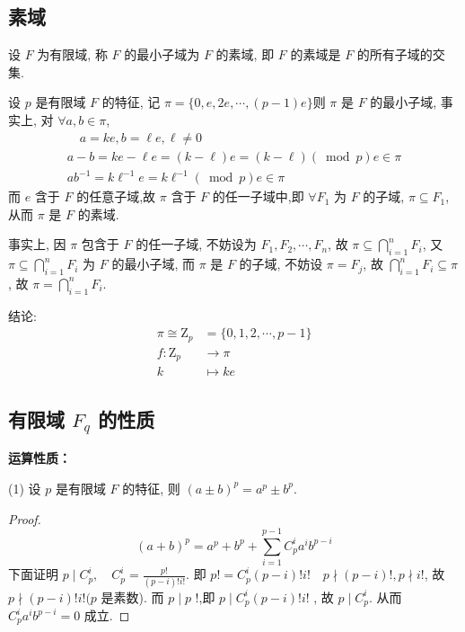 \subsection{素域}
\begin{definition}
    设 $ F $ 为有限域, 称 $ F $ 的最小子域为 $ F $ 的素域, 即 $ F $ 的素域是 $ F $ 的所有子域的交集.
\end{definition}

设 $ p $ 是有限域 $ F $ 的特征, 记 $ \pi=\{0, e, 2 e, \cdots,(p-1) e\} $则 $ \pi $ 是 $ F $ 的最小子域, 事实上, 对 $ \forall a, b \in \pi $,
$$
\begin{array}{l}
\quad a=k e, b=\ell e, \ell \neq 0 \\
a-b=k e-\ell e=(k-\ell) e=(k-\ell)(\bmod p) e \in \pi \\
a b^{-1}=k \ell^{-1} e=k \ell^{-1}(\bmod p) e \in \pi
\end{array}
$$
而 $ e $ 含于 $ F $ 的任意子域,故 $ \pi $ 含于 $ F $ 的任一子域中,即 $ \forall F_{1} $ 为 $ F $ 的子域, $ \pi \subseteq F_{1} $, 从而 $ \pi $ 是 $ F $ 的素域.

事实上, 因 $ \pi $ 包含于 $ F $ 的任一子域, 不妨设为 $ F_{1}, F_{2}, \cdots, F_{n} $, 故 $ \pi \subseteq \bigcap\limits_{i=1}^{n} F_{i} $, 又 $ \pi \subseteq \bigcap\limits_{i=1}^{n} F_{i} $ 为 $ F $ 的最小子域, 而 $ \pi $ 是 $ F $ 的子域, 不妨设 $ \pi=F_{j} $, 故 $ \bigcap\limits_{i=1}^{n} F_{i} \subseteq \pi $, 故 $ \pi=\bigcap\limits_{i=1}^{n} F_{i} $.

结论:
$$
\begin{aligned}
\pi \cong \mathrm{Z}_{p}&=\{0,1,2, \cdots, p-1\}\\
f: \mathrm{Z}_{p} & \rightarrow \pi \\
k & \mapsto k e
\end{aligned}
$$

\subsection{有限域 $ F_{q} $ 的性质}
\textbf{运算性质：}

(1) 设 $ p $ 是有限域 $ F $ 的特征, 则 $ (a \pm b)^{p}=a^{p} \pm b^{p} $.
\begin{proof}
    $$ (a+b)^{p}=a^{p}+b^{p}+\sum_{i=1}^{p-1} C_{p}^{i} a^{i} b^{p-i} $$
下面证明 $ p \mid C_{p}^{i} ,\quad C_{p}^{i}=\frac{p !}{(p-i) ! i !} $.
即 $ p !=C_{p}^{i}(p-i) ! i ! \quad p \nmid(p-i) ! , p \nmid i ! $,
故 $ p \nmid(p-i) ! i !(p $ 是素数).
而 $ p \mid p $ !,即 $ p \mid C_{p}^{i}(p-i) ! i ! $ , 故 $ p \mid C_{p}^{i} $.
从而 $ C_{p}^{i} a^{i} b^{p-i}=0 $ 成立.
\end{proof}

